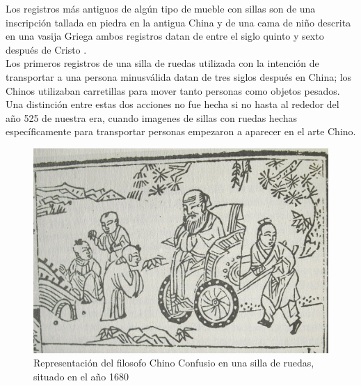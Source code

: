 Los registros m\'as antiguos de alg\'un tipo de mueble con sillas son de una
inscripci\'on tallada en piedra en la antigua China y de una cama de ni\~no
descrita en una vasija Griega ambos registros datan de entre el siglo quinto y
sexto despu\'es de Cristo \parencite{history}.
\\
Los primeros registros de una silla de ruedas utilizada con la intenci\'on de
transportar a una persona minusv\'alida datan de tres siglos despu\'es en China;
los Chinos utilizaban carretillas para mover tanto personas como objetos
pesados. Una distinci\'on entre estas dos acciones no fue hecha si no hasta al
rededor del a\~no 525 de nuestra era, cuando imagenes de sillas con ruedas
hechas espec\'ificamente para transportar personas empezaron a aparecer en el
arte Chino. \parencite{primera}
\begin{figure}[th]
    \centering
    \includegraphics[width=\textwidth]{Figures/confusio.jpg}
    \decoRule
    \caption[A wheelchair]{Representaci\'on del filosofo Chino Confusio en una
    silla de ruedas, situado en el a\~no 1680}
    \label{fig:Electron}
\end{figure}

